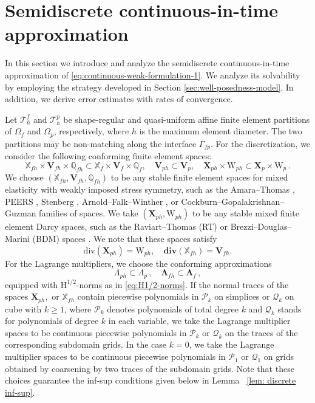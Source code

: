 \documentclass[11pt]{article}
\numberwithin{equation}{section}
\newcommand{\bLambda}{{\boldsymbol\Lambda}}
\newcommand{\0}{{\mathbf{0}}}
\def\bX{\mathbf{X}}
\def\bV{\mathbf{V}}
\newcommand\bbQ{\mathbb{Q}}
\newcommand\bbX{\mathbb{X}}
\newcommand{\cT}{\mathcal{T}}
\newcommand{\cP}{\mathcal{P}}
\newcommand{\cQ}{\mathcal{Q}}
\def\H{\mathrm{H}}
\def\W{\mathrm{W}}
\def\bdiv{\mathbf{div}}
\def\div{\mathrm{div}}
\numberwithin{equation}{section}
\begin{document}
\section{Semidiscrete continuous-in-time approximation}\label{sec:Semidiscrete continuous-in-time approximation}

In this section we introduce and analyze the semidiscrete continuous-in-time approximation of \eqref{eq:continuous-weak-formulation-1}. 
We analyze its solvability by employing the strategy developed in Section \ref{sec:well-posedness-model}. 
In addition, we derive error estimates with rates of convergence. 

Let $\cT_h^f$ and $\cT_h^p$ be shape-regular and quasi-uniform affine finite element partitions of $\Omega_f$ and $\Omega_p$, respectively, where $h$ is the maximum element diameter. The two partitions may be non-matching along the interface $\Gamma_{fp}$. For the discretization, we consider the following conforming finite element spaces:
\begin{equation*}
\bbX_{fh}\times \bV_{fh}\times \bbQ_{fh}\subset \bbX_f \times \bV_f\times \bbQ_{f}, \quad
\bV_{ph}\subset\bV_p, \quad \bX_{ph}\times\W_{ph} \subset \bX_p\times\W_p \,.
\end{equation*}
%
We choose $(\bbX_{fh}, \bV_{fh}, \bbQ_{fh})$ to be any stable finite element spaces for mixed elasticity with weakly imposed stress symmetry, such as the
Amara--Thomas \cite{at1979}, PEERS \cite{abd1984}, Stenberg
\cite{stenberg1988}, Arnold--Falk--Winther \cite{afw2007,awanou2013},
or Cockburn--Gopalakrishnan--Guzman \cite{cgg2010} families of spaces. 
We take $(\bX_{ph},\W_{ph})$ to be any stable mixed finite element Darcy spaces, such as the Raviart--Thomas (RT) or Brezzi--Douglas--Marini (BDM) spaces \cite{Brezzi-Fortin}. 
We note that these spaces satisfy
\begin{equation}\label{eq: div-prop} 
\div(\bX_{ph})=\W_{ph}, \quad
\bdiv(\bbX_{fh}) = \bV_{fh}.
\end{equation}
%
For the Lagrange multipliers, we choose the conforming approximations
%
\begin{equation}\label{defn-Lambda-h}
\Lambda_{ph} \subset \Lambda_{p}\,,\quad 
\bLambda_{fh} \subset \bLambda_{f}\,,
\end{equation}
%
equipped with $\H^{1/2}$-norms as in \eqref{eq:H1/2-norms}. If the normal traces of the spaces $\bX_{ph},$ or $\bbX_{fh}$ contain piecewise polynomials in $\cP_k$ on simplices or $\cQ_k$ on cube with $k \geq 1$, where $\cP_k$ denotes polynomials of total degree $k$ and $\cQ_k$ stands for polynomials of degree $k$ in each variable, we take the Lagrange multiplier spaces to be continuous piecewise polynomials in $\cP_k$ or $\cQ_k$ on the traces of the corresponding subdomain grids. In the case $k = 0$, we take the Lagrange multiplier spaces to be continuous piecewise polynomials in $\cP_1$ or $\cQ_1$ on grids obtained by coarsening by two traces of the subdomain grids. Note that these choices guarantee the inf-sup conditions given below in Lemma ~\ref{lem: discrete inf-sup}.
\end{document}
